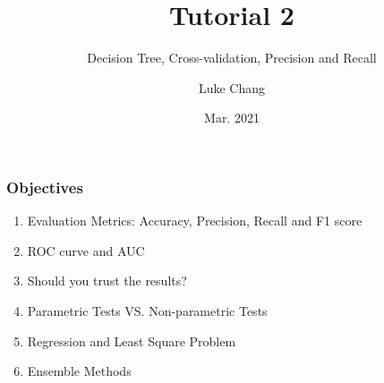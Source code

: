 \documentclass[aspectratio=169, 10pt]{beamer}
\title{Tutorial 2}
\subtitle{Decision Tree, Cross-validation, Precision and Recall}
\author{Luke Chang}
\institute{The University of Auckland}
\date{Mar. 2021}
\begin{document}
\frame{\titlepage}

\begin{frame}
    \frametitle{Objectives}
    
    \begin{enumerate}
        \item Evaluation Metrics: Accuracy, Precision, Recall and F1 score
        \item ROC curve and AUC
        \item Should you trust the results?
        \item Parametric Tests VS. Non-parametric Tests
        \item Regression and Least Square Problem
        \item Ensemble Methods
    \end{enumerate}
    
\end{frame}
\end{document}

